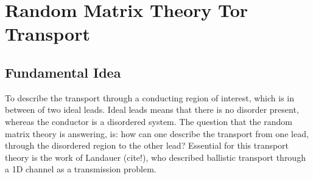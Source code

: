 \section{Random Matrix Theory Tor Transport}\label{sec:random-matrix}

\subsection{Fundamental Idea}
To describe the transport through a conducting region of interest, which is in between of two ideal leads. Ideal leads means that there is no disorder present, whereas the conductor is a disordered system. The question that the random matrix theory is answering, is: how can one describe the transport from one lead, through the disordered region to the other lead? Essential for this transport theory is the work of Landauer (cite!), who described ballistic transport through a 1D channel as a transmission problem. 

